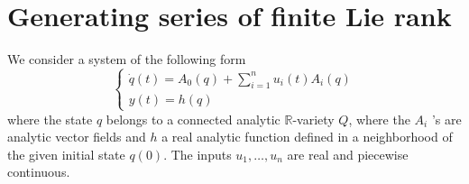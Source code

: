 \documentclass[a4paper,12pt]{article}
\newcommand{\R}{\mathbb{R}}
\begin{document}
\section{Generating series of finite Lie rank}

We consider a system of the following form
\begin{equation} \label{eq:1}
	\begin{cases}
		\dot{q}(t)=A_0(q)+\sum_{i=1}^n u_i(t) A_i(q) \\
		y(t)=h(q)
	\end{cases}
\end{equation}
where the state $q$ belongs to a connected analytic $\R$-variety $Q$, where the $A_i$ 's are analytic vector fields and $h$ a real analytic function defined in a neighborhood of the given initial state $q(0)$. The inputs $u_1, \ldots, u_n$ are real and piecewise continuous.
\end{document}
